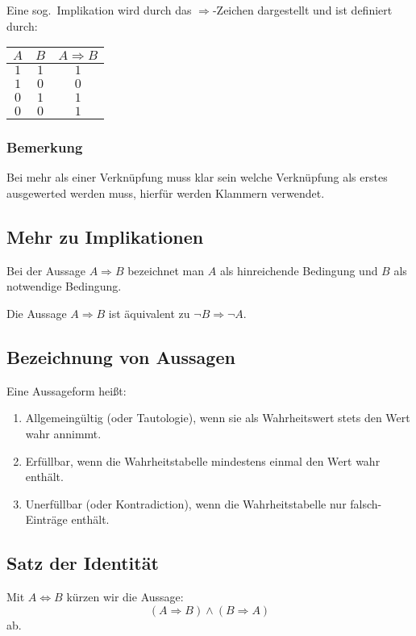 Eine sog.\ Implikation wird durch das $\Rightarrow$-Zeichen dargestellt und
ist definiert durch:
\begin{center}
    \begin{tabular}{ccc}
        \toprule
        $A$ & $B$ & $A \Rightarrow B$ \\
        \midrule
        $1$ & $1$ & $1$ \\
        $1$ & $0$ & $0$ \\
        $0$ & $1$ & $1$ \\
        $0$ & $0$ & $1$ \\
        \bottomrule
    \end{tabular}
\end{center}

\subsubsection{Bemerkung}
Bei mehr als einer Verknüpfung muss klar sein welche Verknüpfung
als erstes ausgewerted werden muss, hierfür werden Klammern verwendet.

\subsection{Mehr zu Implikationen}
Bei der Aussage $A \Rightarrow B$ bezeichnet man $A$ als hinreichende
Bedingung und $B$ als notwendige Bedingung.

Die Aussage $A \Rightarrow B$ ist äquivalent zu $\lnot B \Rightarrow \lnot A$.

\subsection{Bezeichnung von Aussagen}
Eine Aussageform heißt:
\begin{enumerate}[label= (\alph*)]
    \item Allgemeingültig (oder Tautologie), wenn sie als Wahrheitswert stets
        den Wert wahr annimmt.
    \item Erfüllbar, wenn die Wahrheitstabelle mindestens einmal den Wert
        wahr enthält.
    \item Unerfüllbar (oder Kontradiction), wenn die Wahrheitstabelle nur
        falsch-Einträge enthält.
\end{enumerate}

\subsection{Satz der Identität}
Mit $A \Leftrightarrow B$ kürzen wir die Aussage:
\begin{equation*}
    (A \Rightarrow B) \land (B \Rightarrow A)
\end{equation*}
ab.

